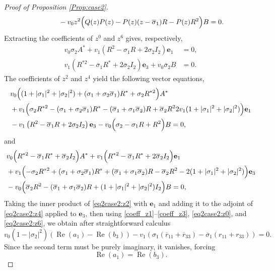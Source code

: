 \documentclass[12pt, reqno]{amsart}
\theoremstyle{definition}
\theoremstyle{remark}
\numberwithin{equation}{section}
\begin{document}
\begin{proof}[Proof of Proposition \ref{Prop:case2}]
\begin{align}
		&\qquad \qquad - v_0 z^2\Bigl(  Q(z) P(z)  -  P(z) (z - \overline{\sigma}_1) R  - P(z) R^2\Bigr)   B = 0.\nonumber 
	\end{align}
	Extracting the coefficients of $z^0$ and $z^6$ gives, respectively,
	\begin{align}
		v_0 \sigma_2 A^* + v_1 \left( R^2 - \sigma_1 R + 2\sigma_2 I_2 \right) \mathbf{e}_1 &= 0, \label{eq2case2:z0} \\
		v_1 \left( R^{*2} - \overline{\sigma}_1 R^* + 2\overline{\sigma}_2 I_2 \right) \mathbf{e}_3 + v_0 \overline{\sigma}_2 B &= 0. \label{eq2case2:z6}
	\end{align}
	The coefficients of $z^2$ and $z^4$ yield the following vector equations,
	\begin{equation}\label{eq2case2:z2}   
		\begin{aligned}
			&v_0\Bigl( (1 + |\sigma_1|^2 + |\sigma_2|^2) +  (\sigma_1 + \sigma_2 \overline{\sigma}_1) R^*  + \sigma_2 R^{*2}\Bigr) A^* \\
			&+ v_1 \Bigl(\sigma_2 R^{*2} -(\sigma_1 + \sigma_2 \overline{\sigma}_1) R^* - (\overline{\sigma}_1 + \sigma_1 \overline{\sigma}_2) R + \overline{\sigma}_2 R^2 2v_1 (1 + |\sigma_1|^2 + |\sigma_2|^2)\Bigr) \mathbf{e}_1 \\
			&-v_1 \left( R^{2} - \overline{\sigma}_1 R + 2\sigma_2 I_2 \right) \mathbf{e}_3- v_0\Bigl( \sigma_2  - \sigma_1 R  + R^2\Bigr) B = 0,
		\end{aligned}
	\end{equation}
	and \begin{align}
		&	v_0 \Bigl( R^{*2} - \overline{\sigma}_1 R^* + \overline{\sigma}_2 I_2\Bigr) A^*+ v_1\Bigl( R^{*2} - \overline{\sigma}_1 R^* + 2\overline{\sigma}_2 I_2 \Bigr) \mathbf{e}_1 \nonumber \\
		&+ v_1\Bigl( -\sigma_2 R^{*2} + (\sigma_1 + \sigma_2 \overline{\sigma}_1) R^* + (\overline{\sigma}_1 + \sigma_1 \overline{\sigma}_2) R - \overline{\sigma}_2 R^2 - 2(1 + |\sigma_1|^2 + |\sigma_2|^2)\Bigr) \mathbf{e}_3  \label{eq2case2:z4}\\
		&- v_0 \Bigl(\overline{\sigma}_2 R^2 - (\overline{\sigma}_1 + \sigma_1 \overline{\sigma}_2) R + (1 + |\sigma_1|^2 + |\sigma_2|^2) I_2\Bigr) B = 0, \nonumber 
	\end{align}
	Taking the inner product of \eqref{eq2case2:z2} with $\mathbf{e}_1$ and adding it to the adjoint of \eqref{eq2case2:z4} applied to $\mathbf{e}_3$, then using  \eqref{coeff_z1}--\eqref{coeff_z3}, \eqref{eq2case2:z0}, and \eqref{eq2case2:z6}, we obtain after straightforward calculus 
	\begin{equation}\label{key_real2}
		v_0\left(1-\left|\sigma_2 \right|^2  \right) \left(\operatorname{Re}(a_1) -\operatorname{Re}(b_3)\right)-v_1\left( \sigma_1(\overline{r}_{11}+\overline{r}_{33})-\overline{\sigma}_1(r_{11}+r_{33})\right) = 0. 
	\end{equation}
	Since the second term must be purely imaginary, it vanishes, forcing
	\begin{equation}\label{key_real_eq}
		\operatorname{Re}(a_1) = \operatorname{Re}(b_3).	
	\end{equation}
	

\end{proof}
\end{document}

